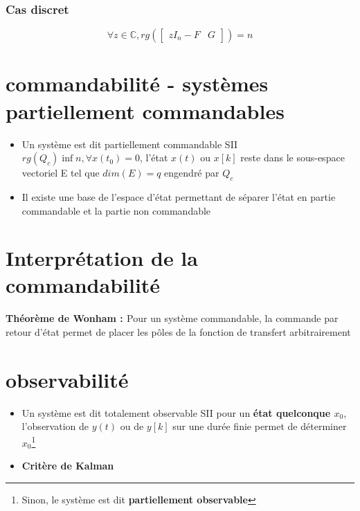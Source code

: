 {{{{{{\begin{itemize}
        \subsubsection{Cas discret}
        \begin{center}
            \[
                \forall z \in \mathbb{C}, 
                rg(
                \begin{bmatrix}
                    zI_{n} - F & G
                \end{bmatrix}
                ) = n
            \]
        \end{center}
\end{itemize}
\newpage
\section{commandabilité - systèmes partiellement commandables}
\begin{itemize}
    \item Un système est dit partiellement commandable SII $rg(Q_{c}) \inf n, \forall x(t_{0}) = 0$, l'état $x(t)$ ou $x[k]$ reste dans le sous-espace vectoriel E tel que $dim(E) = q$ engendré par $Q_{c}$
    \item Il existe une base de l'espace d'état permettant de séparer l'état en partie commandable et la partie non commandable
\end{itemize}
\section{Interprétation de la commandabilité}
\textbf{\textcolor{BrickRed}{Théorème de Wonham : }} \newline
Pour un système commandable, la commande par retour d'état permet de placer les pôles de la fonction de transfert arbitrairement 
\newpage
\section{observabilité}
\begin{itemize}
    \item \large{Un système est dit totalement observable SII pour un \textbf{état quelconque $x_{0}$}, l'observation de $y(t)$ ou de $y[k]$ sur une durée finie permet de déterminer $x_{0}$\footnote{Sinon, le système est dit \textbf{partiellement observable}}}
    \item \textbf{Critère de Kalman}

\end{itemize}}}}}}}
